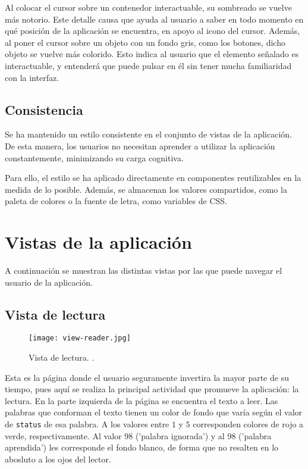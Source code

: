 Al colocar el cursor sobre un contenedor interactuable, su sombreado se vuelve más notorio. Este detalle causa que ayuda al usuario a saber en todo momento en qué posición de la aplicación se encuentra, en apoyo al icono del cursor. Además, al poner el cursor sobre un objeto con un fondo gris, como los botones, dicho objeto se vuelve más colorido. Esto indica al usuario que el elemento señalado es interactuable, y entenderá que puede pulsar en él sin tener mucha familiaridad con la interfaz.

\subsection{Consistencia}

Se ha mantenido un estilo consistente en el conjunto de vistas de la aplicación. De esta manera, los usuarios no necesitan aprender a utilizar la aplicación constantemente, minimizando su carga cognitiva.

Para ello, el estilo se ha aplicado directamente en componentes reutilizables en la medida de lo posible. Además, se almacenan los valores compartidos, como la paleta de colores o la fuente de letra, como variables de CSS.

\section{Vistas de la aplicación}

A continuación se muestran las distintas vistas por las que puede navegar el usuario de la aplicación.

\subsection{Vista de lectura}

\begin{figure}[H]
	\texttt{[image: view-reader.jpg]}
	\caption[Diagrama entidad-relación]{Vista de lectura. .}
\end{figure}

Esta es la página donde el usuario seguramente invertira la mayor parte de su tiempo, pues aquí se realiza la principal actividad que promueve la aplicación: la lectura. En la parte izquierda de la página se encuentra el texto a leer. Las palabras que conforman el texto tienen un color de fondo que varía según el valor de \texttt{status} de esa palabra. A los valores entre $1$ y $5$ corresponden colores de rojo a verde, respectivamente. Al valor $98$ ('palabra ignorada') y al $98$ ('palabra aprendida') les corresponde el fondo blanco, de forma que no resalten en lo abosluto a los ojos del lector.

